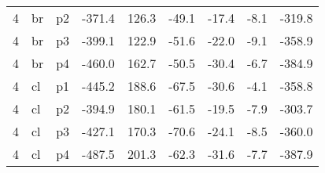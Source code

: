 \documentclass[a4paper]{article}
\begin{document}
\begin{table}[ht]
\begin{tabular}{rllrrrrrr}
   4 & br & p2 & -371.4 & 126.3 & -49.1 & -17.4 & -8.1 & -319.8 \\ 
   4 & br & p3 & -399.1 & 122.9 & -51.6 & -22.0 & -9.1 & -358.9 \\ 
   4 & br & p4 & -460.0 & 162.7 & -50.5 & -30.4 & -6.7 & -384.9 \\ 
   4 & cl & p1 & -445.2 & 188.6 & -67.5 & -30.6 & -4.1 & -358.8 \\ 
   4 & cl & p2 & -394.9 & 180.1 & -61.5 & -19.5 & -7.9 & -303.7 \\ 
   4 & cl & p3 & -427.1 & 170.3 & -70.6 & -24.1 & -8.5 & -360.0 \\ 
   4 & cl & p4 & -487.5 & 201.3 & -62.3 & -31.6 & -7.7 & -387.9 \\ 
   \hline
\end{tabular}
\end{table}
\end{document}
